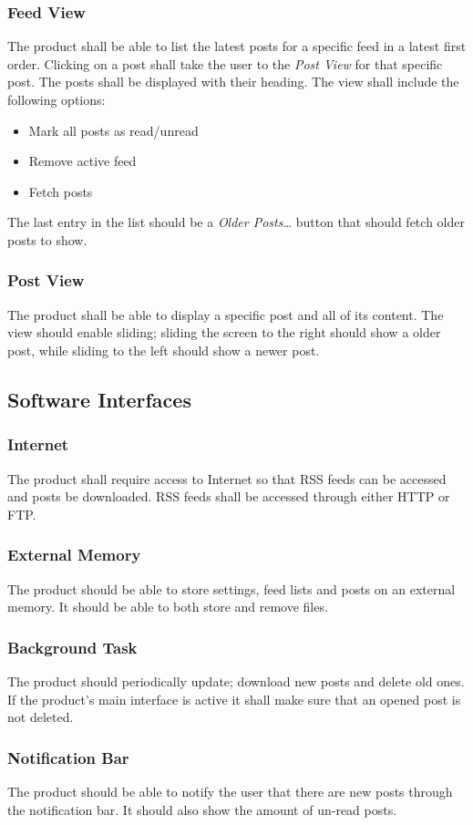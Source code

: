 \subsubsection{Feed View}
The product shall be able to list the latest posts for a specific feed in a latest first order. Clicking on a post shall take the user to the \textit{Post View} for that specific post. The posts shall be displayed with their heading. The view shall include the following options:

\begin{itemize}
  \item Mark all posts as read/unread
  \item Remove active feed
  \item Fetch posts
\end{itemize}
The last entry in the list should be a \textit{Older Posts\ldots} button that should fetch older posts to show.


\subsubsection{Post View}
The product shall be able to display a specific post and all of its content. The view should enable sliding; sliding the screen to the right should show a older post, while sliding to the left should show a newer post. 


\subsection{Software Interfaces}


\subsubsection{Internet}
The product shall require access to Internet so that RSS feeds can be accessed and posts be downloaded. RSS feeds shall be accessed through either HTTP or FTP.


\subsubsection{External Memory}
The product should be able to store settings, feed lists and posts on an external memory. It should be able to both store and remove files. 


\subsubsection{Background Task}
The product should periodically update; download new posts and delete old ones. If the product's main interface is active it shall make sure that an opened post is not deleted.


\subsubsection{Notification Bar}
The product should be able to notify the user that there are new posts through the notification bar. It should also show the amount of un-read posts.